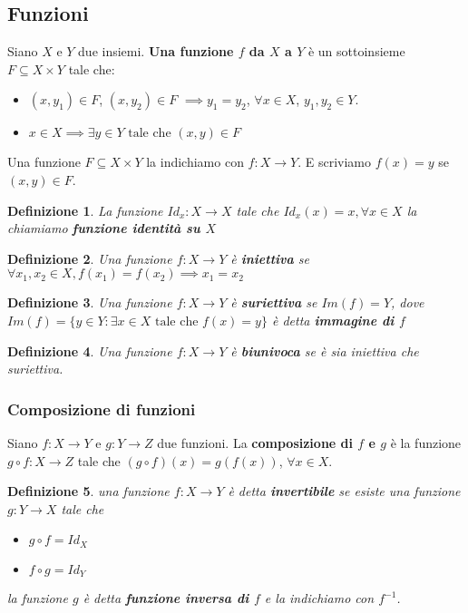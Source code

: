 \documentclass[a4paper,12pt]{article}
\theoremstyle{mystyle}
\newtheorem*{definition}{Definizione}
\begin{document}
\subsection{Funzioni}

Siano \(X\) e \(Y\) due insiemi. \textbf{Una funzione \(f\) da \(X\) a \(Y\)} è un sottoinsieme \(F \subseteq X \times Y\) tale che:
\begin{itemize}
    \item \((x, y_1) \in F\), \((x,y_2) \in F\) \(\implies y_1 = y_2\), \(\forall x \in X\), \(y_1,y_2 \in Y\).
    \item \(x \in X \implies \exists y \in Y \text{ tale che } (x,y) \in F\)
\end{itemize}


Una funzione \(F \subseteq X \times Y\) la indichiamo con \(f : X \to Y\). E scriviamo \(f(x) = y\) se \((x,y) \in F\).


\begin{definition}
    La funzione \(Id_x : X \rightarrow X \) tale che \(Id_x (x) = x, \forall x \in X\) la chiamiamo \textbf{funzione identità su \(X\)}
\end{definition}

\begin{definition}
    Una funzione \(f: X \rightarrow Y\) è \textbf{iniettiva} se \(\forall x_1, x_2 \in X, f(x_1) = f(x_2) \implies x_1 = x_2\)
\end{definition}

\begin{definition}
    Una funzione \(f: X \rightarrow Y\) è \textbf{suriettiva} se \(Im(f) = Y\), dove \(Im(f) = \{ y \in Y : \exists x \in X \text{ tale che } f(x) = y \}\) è detta \textbf{immagine di \(f\)}
\end{definition}

\begin{definition}
    Una funzione \(f: X \rightarrow Y\) è \textbf{biunivoca} se è sia iniettiva che suriettiva.
\end{definition}

\subsubsection{Composizione di funzioni}
Siano \(f: X \rightarrow Y\) e \(g: Y \rightarrow Z\) due funzioni. La \textbf{composizione di \(f\) e \(g\)} è la funzione \(g \circ f : X \rightarrow Z\) tale che \((g \circ f)(x) = g(f(x))\), \(\forall x \in X\).

\begin{definition}
    una funzione \(f: X \rightarrow Y\) è detta \textbf{invertibile} se esiste una funzione \(g: Y \rightarrow X\) tale che
    \begin{itemize}
        \item \(g \circ f = Id_X\)
        \item \(f \circ g = Id_Y\)
    \end{itemize}
    la funzione \(g\) è detta \textbf{funzione inversa di \(f\)} e la indichiamo con \(f^{-1}\).
\end{definition}
\end{document}
